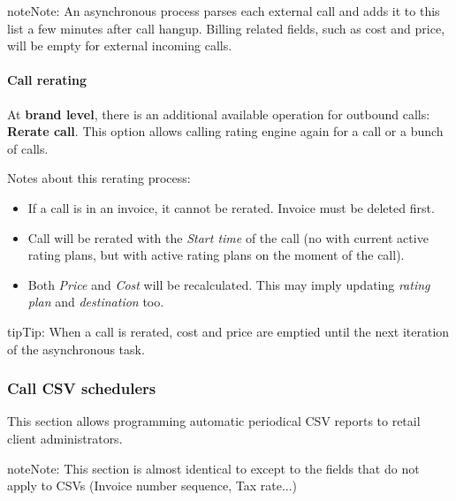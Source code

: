 \documentclass[letterpaper,10pt,english]{sphinxmanual}
\begin{document}
\begin{notice}{note}{Note:}
An asynchronous process parses each external call and adds it to this list a few minutes after call hangup. Billing related fields, such as cost and price, will be empty for external incoming calls.
\end{notice}


\paragraph{Call rerating}
\label{administration_portal/client/retail/calls/external_calls:call-rerating}
At \textbf{brand level}, there is an additional available operation for outbound calls: \textbf{Rerate call}. This option allows calling rating engine again for a call or a bunch of calls.

Notes about this rerating process:
\begin{itemize}
\item {} 
If a call is in an invoice, it cannot be rerated. Invoice must be deleted first.

\item {} 
Call will be rerated with the \emph{Start time} of the call (no with current active rating plans, but with active rating plans
on the moment of the call).

\item {} 
Both \emph{Price} and \emph{Cost} will be recalculated. This may imply updating \emph{rating plan} and \emph{destination} too.

\end{itemize}

\begin{notice}{tip}{Tip:}
When a call is rerated, cost and price are emptied until the next iteration of the asynchronous task.
\end{notice}


\subsubsection{Call CSV schedulers}
\label{administration_portal/client/retail/calls/call_csv_schedulers:call-csv-schedulers}\label{administration_portal/client/retail/calls/call_csv_schedulers::doc}
This section allows programming automatic periodical CSV reports to retail client administrators.

\begin{notice}{note}{Note:}
This section is almost identical to {\hyperref[administration_portal/brand/invoicing/invoice_schedulers:invoice\string-schedulers]{}} except to the
fields that do not apply to CSVs (Invoice number sequence, Tax rate...)
\end{notice}
\end{document}
